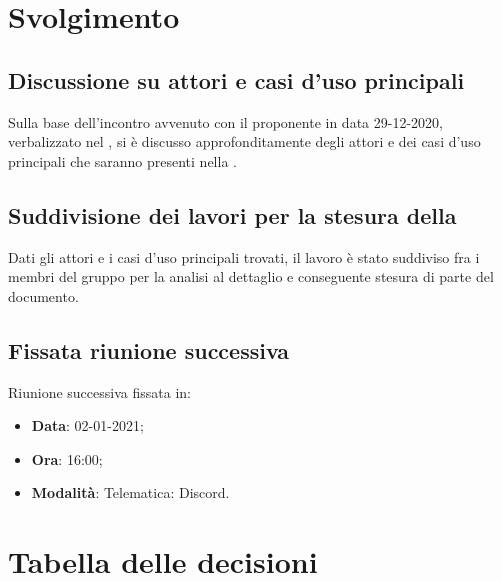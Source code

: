 \documentclass[]{article}
\begin{document}
	\newpage

	\section{Svolgimento}
		\subsection{Discussione su attori e casi d'uso principali}
        Sulla base dell'incontro avvenuto con il proponente in data 29-12-2020, verbalizzato nel , si è discusso approfonditamente degli attori e dei casi d'uso principali che saranno presenti nella .

        \subsection{Suddivisione dei lavori per la stesura della }
        Dati gli attori e i casi d'uso principali trovati, il lavoro è stato suddiviso fra i membri del gruppo per la analisi al dettaglio e conseguente stesura di parte del documento.

		\subsection{Fissata riunione successiva}
		Riunione successiva fissata in:
		\begin{itemize}
			\item \textbf{Data}: 02-01-2021;
			\item \textbf{Ora}: 16:00;
			\item \textbf{Modalità}: Telematica: Discord.
		\end{itemize}

	\newpage

	\section{Tabella delle decisioni}
\end{document}
